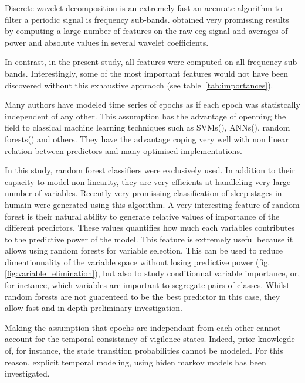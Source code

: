 Discrete wavelet decomposition is an extremely fast an accurate algorithm to filter a periodic signal is
frequency sub-bands. 
 obtained very promissing results by computing a large number of features on the raw \gls{eeg} signal
and averages of power  and absolute values in several wavelet coefficients.

In contrast, in the present study, all features were computed on all frequency sub-bands.
Interestingly, some of the most important features would not have been
 discovered without this exhaustive appraoch (see table~\ref{tab:importances}).

Many authors have modeled time series of epochs as if each epoch was statistcally independent
of any other. This assumption has the advantage of openning the field to classical machine learning techniques such as
SVMs(\citationneeded{}), ANNs(\citationneeded{}), random forests(\citationneeded{}) and others.
They have the advantage coping very well with non linear relation between predictors and many optimised implementations.

In this study, random forest\citationneeded{} classifiers were exclusively used.
In addition to their capacity to model non-linearity, they are very efficients at handleling very large number of variables. 
Recently very promissing classification of sleep stages in humain were generated using this algorithm\citationneeded{}.
A very interesting feature of random forest is their 
natural ability to generate relative values of importance of the different predictors.
These values quantifies how much each variables contributes to the predictive power of the model.
This feature is extremely useful because it allows using random forests for variable selection.
This can be used to reduce dimentionnality of the variable space without losing predictive power (fig.\ref{fig:variable_elimination}),
but also to study conditionnal variable importance, or, for inctance,
which variables are important to segregate pairs of classes.
Whilst random forests are not guarenteed to be the best predictor in this case, 
they allow fast and in-depth preliminary investigation.


Making the assumption that epochs are independant from each other cannot account for the temporal consistancy of vigilence states.
Indeed, prior knowlegde of, for instance, the state transition probabilities cannot be modeled.
For this reason, explicit temporal modeling, using hiden markov models has been investigated\citationneeded{}.

